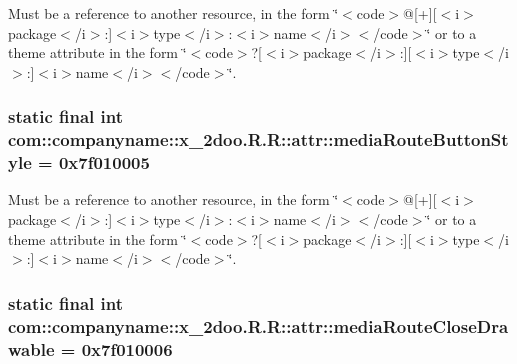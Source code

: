 Must be a reference to another resource, in the form \char`\"{}$<$code$>$@\mbox{[}+\mbox{]}\mbox{[}$<$i$>$package$<$/i$>$:\mbox{]}$<$i$>$type$<$/i$>$:$<$i$>$name$<$/i$>$$<$/code$>$\char`\"{} or to a theme attribute in the form \char`\"{}$<$code$>$?\mbox{[}$<$i$>$package$<$/i$>$:\mbox{]}\mbox{[}$<$i$>$type$<$/i$>$:\mbox{]}$<$i$>$name$<$/i$>$$<$/code$>$\char`\"{}. \hypertarget{classcom_1_1companyname_1_1x__2doo_1_1_r_1_1attr_3f7f7787c2e3de0acdbd5e16390f2975}{
\subsubsection[{mediaRouteButtonStyle}]{\setlength{\rightskip}{0pt plus 5cm}static final int com::companyname::x\_\-2doo.R.R::attr::mediaRouteButtonStyle = 0x7f010005}}
\label{classcom_1_1companyname_1_1x__2doo_1_1_r_1_1attr_3f7f7787c2e3de0acdbd5e16390f2975}


Must be a reference to another resource, in the form \char`\"{}$<$code$>$@\mbox{[}+\mbox{]}\mbox{[}$<$i$>$package$<$/i$>$:\mbox{]}$<$i$>$type$<$/i$>$:$<$i$>$name$<$/i$>$$<$/code$>$\char`\"{} or to a theme attribute in the form \char`\"{}$<$code$>$?\mbox{[}$<$i$>$package$<$/i$>$:\mbox{]}\mbox{[}$<$i$>$type$<$/i$>$:\mbox{]}$<$i$>$name$<$/i$>$$<$/code$>$\char`\"{}. \hypertarget{classcom_1_1companyname_1_1x__2doo_1_1_r_1_1attr_d35f0d89092235f61d28b127571f4a54}{
\subsubsection[{mediaRouteCloseDrawable}]{\setlength{\rightskip}{0pt plus 5cm}static final int com::companyname::x\_\-2doo.R.R::attr::mediaRouteCloseDrawable = 0x7f010006}}
\label{classcom_1_1companyname_1_1x__2doo_1_1_r_1_1attr_d35f0d89092235f61d28b127571f4a54}



